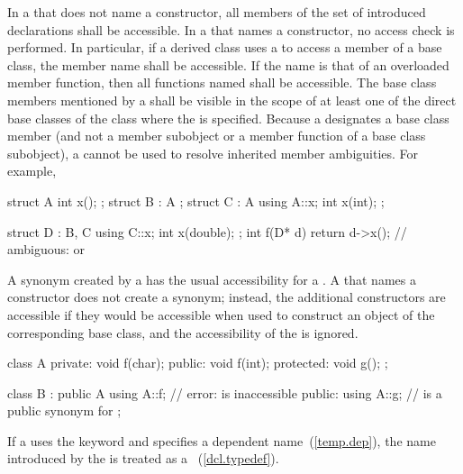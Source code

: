 \pnum
{}%
In a  that does not name a constructor,
all members of the set of introduced declarations shall be accessible.
In a  that names a constructor,
no access check is performed.
In particular, if a derived class uses a
 to access a member of a base class, the
member name shall be accessible. If the name is that of an overloaded
member function, then all functions named shall be accessible. The base
class members mentioned by a  shall be
visible in the scope of at least one of the direct base classes of the
class where the  is specified. \enternote
Because a  designates a base class member
(and not a member subobject or a member function of a base class
subobject), a  cannot be used to resolve
inherited member ambiguities. For example,

\begin{codeblock}
struct A { int x(); };
struct B : A { };
struct C : A {
  using A::x;
  int x(int);
};

struct D : B, C {
  using C::x;
  int x(double);
};
int f(D* d) {
  return d->x();    // ambiguous:  or 
}
\end{codeblock}
\exitnote

\pnum
A synonym created by a  has the usual
accessibility for a .
A  that names a constructor does not
create a synonym; instead, the additional constructors
are accessible if they would be accessible
when used to construct an object of the corresponding base class,
and the accessibility of the  is ignored.
\enterexample

\begin{codeblock}
class A {
private:
    void f(char);
public:
    void f(int);
protected:
    void g();
};

class B : public A {
  using A::f;       // error:  is inaccessible
public:
  using A::g;       //  is a public synonym for 
};
\end{codeblock}
\exitexample

\pnum
If a  uses the keyword  and
specifies a dependent name~(\ref{temp.dep}), the name introduced by the
 is treated as a
~(\ref{dcl.typedef}).%

